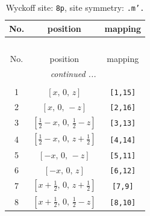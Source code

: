 \documentclass[fleqn,8pt]{jsarticle}
\begin{document}
\begin{longtable}{ccc}
\caption{Wyckoff site: {\tt 8p}, site symmetry: {\tt .m'.}}
 \\
 \hline \hline
No. & position & mapping \\ \hline \endfirsthead

\multicolumn{2}{l}{\tablename\ \thetable{}} \\
 \hline \hline
No. & position & mapping \\ \hline \endhead

 \hline \hline
\multicolumn{2}{r}{\footnotesize\it continued ...} \\ \endfoot

 \hline \hline
\multicolumn{2}{r}{} \\ \endlastfoot

1 & $\left[ x,\, 0,\, z \right]$ & {\tt [1,15]} \\ \hline
2 & $\left[ x,\, 0,\, - z \right]$ & {\tt [2,16]} \\ \hline
3 & $\left[ \frac{1}{2} - x,\, 0,\, \frac{1}{2} - z \right]$ & {\tt [3,13]} \\ \hline
4 & $\left[ \frac{1}{2} - x,\, 0,\, z + \frac{1}{2} \right]$ & {\tt [4,14]} \\ \hline
5 & $\left[ - x,\, 0,\, - z \right]$ & {\tt [5,11]} \\ \hline
6 & $\left[ - x,\, 0,\, z \right]$ & {\tt [6,12]} \\ \hline
7 & $\left[ x + \frac{1}{2},\, 0,\, z + \frac{1}{2} \right]$ & {\tt [7,9]} \\ \hline
8 & $\left[ x + \frac{1}{2},\, 0,\, \frac{1}{2} - z \right]$ & {\tt [8,10]} \\
\end{longtable}
\renewcommand{\arraystretch}{1.2}
\end{document}
